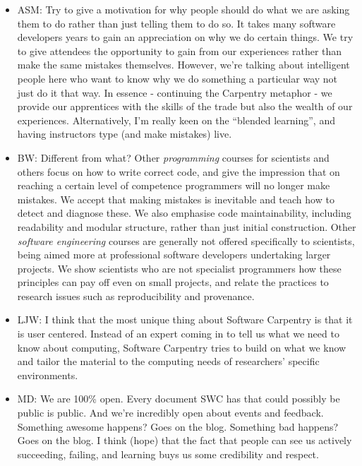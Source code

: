 \documentclass{article}
\begin{document}
\begin{itemize}
  \item ASM: Try to give a motivation for why people should do what we
    are asking them to do rather than just telling them to do so. It
    takes many software developers years to gain an appreciation on
    why we do certain things. We try to give attendees the opportunity
    to gain from our experiences rather than make the same mistakes
    themselves. However, we're talking about intelligent people here
    who want to know why we do something a particular way not just do
    it that way. In essence - continuing the Carpentry metaphor - we
    provide our apprentices with the skills of the trade but also the
    wealth of our experiences.  Alternatively, I'm really keen on the
    ``blended learning'', and having instructors type (and make
    mistakes) live.

  \item BW: Different from what? Other {\em programming} courses for
    scientists and others focus on how to write correct code,
    and give the impression that on reaching a certain level of competence
    programmers will no longer make mistakes. We accept that making
    mistakes is inevitable and teach how to detect and diagnose these.
    We also emphasise code maintainability, including readability and
    modular structure, rather than just initial construction.
    Other {\em software engineering} courses are generally not offered
    specifically to scientists, being aimed more at professional
    software developers undertaking larger projects. We show scientists
    who are not specialist programmers how these principles can pay off
    even on small projects, and relate the practices to research issues such as
    reproducibility and provenance.
    
  \item LJW: I think that the most unique thing about Software
    Carpentry is that it is user centered.  Instead of an expert
    coming in to tell us what we need to know about computing,
    Software Carpentry tries to build on what we know and tailor the
    material to the computing needs of researchers' specific
    environments.

  \item MD: We are 100\% open. Every document SWC has that could
    possibly be public is public. And we're incredibly open about
    events and feedback. Something awesome happens? Goes on the
    blog. Something bad happens? Goes on the blog. I think (hope) that
    the fact that people can see us actively succeeding, failing, and
    learning buys us some credibility and respect.


\end{itemize}
\end{document}
